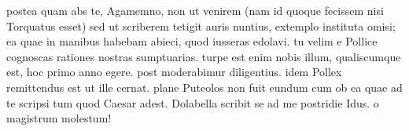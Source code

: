 


 postea quam abs te, Agamemno, non ut venirem (nam id quoque fecissem nisi Torquatus esset) sed ut scriberem tetigit auris nuntius, extemplo instituta omisi; ea quae in manibus habebam abieci, quod iusseras edolavi. tu velim e Pollice cognoscas rationes nostras sumptuarias. turpe est enim nobis illum, qualiscumque est, hoc primo anno egere. post moderabimur diligentius. idem Pollex remittendus est ut ille cernat. plane Puteolos non fuit eundum cum ob ea quae ad te scripsi tum quod Caesar adest. Dolabella scribit se ad me postridie Idus. o magistrum molestum!
